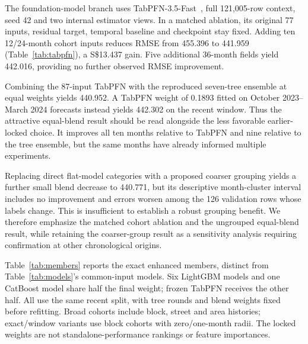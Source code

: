 \documentclass[conference]{IEEEtran}
\newcommand{\sgd}{S\$}
\begin{document}
The foundation-model branch uses TabPFN-3.5-Fast~\cite{tabpfn35}, full 121,005-row context, seed 42 and two internal estimator views. In a matched ablation, its original 77 inputs, residual target, temporal baseline and checkpoint stay fixed. Adding ten 12/24-month cohort inputs reduces RMSE from 455.396 to 441.959 (Table~\ref{tab:tabpfn}), a \sgd13.437 gain. Five additional 36-month fields yield 442.016, providing no further observed RMSE improvement.

Combining the 87-input TabPFN with the reproduced seven-tree ensemble at equal weights yields 440.952. A TabPFN weight of 0.1893 fitted on October 2023--March 2024 forecasts instead yields 442.302 on the recent window. Thus the attractive equal-blend result should be read alongside the less favorable earlier-locked choice. It improves all ten months relative to TabPFN and nine relative to the tree ensemble, but the same months have already informed multiple experiments.

Replacing direct flat-model categories with a proposed coarser grouping yields a further small blend decrease to 440.771, but its descriptive month-cluster interval includes no improvement and errors worsen among the 126 validation rows whose labels change. This is insufficient to establish a robust grouping benefit. We therefore emphasize the matched cohort ablation and the ungrouped equal-blend result, while retaining the coarser-group result as a sensitivity analysis requiring confirmation at other chronological origins.

\begin{table}[t]
\caption{Exact grouped-flat-model ensemble members on the recent split. Errors are in SGD; rounded weights are percentages of the final blend. LGB suffixes denote leaf counts; Cat6 denotes depth six. The last two rows are summaries.}
\label{tab:members}
\centering\small

\end{table}

Table~\ref{tab:members} reports the exact enhanced members, distinct from Table~\ref{tab:models}'s common-input models. Six LightGBM models and one CatBoost model share half the final weight; frozen TabPFN receives the other half. All use the same recent split, with tree rounds and blend weights fixed before refitting. Broad cohorts include block, street and area histories; exact/window variants use block cohorts with zero/one-month radii. The locked weights are not standalone-performance rankings or feature importances.
\end{document}
